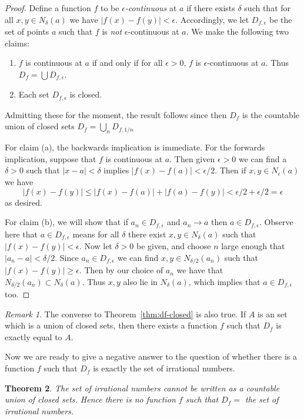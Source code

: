 \documentclass[11pt,oneside]{amsbook}
\theoremstyle{definition}
\theoremstyle{plain}
\newtheorem{theorem}{Theorem}[section]
\theoremstyle{definition}
\theoremstyle{remark}
\newtheorem{remark}[theorem]{Remark}
\numberwithin{equation}{section}
\numberwithin{figure}{section}
\begin{document}
\begin{proof}
  Define a function $f$ to be \emph{$\epsilon$-continuous} at $a$ if there exists $\delta$ such that for all $x,y\in N_\delta(a)$ we have $|f(x)-f(y)|<\epsilon$. Accordingly, we let $D_{f,\epsilon}$ be the set of points $a$ such that $f$ is \emph{not} $\epsilon$-continuous at $a$. We make the following two claims:
  \begin{enumerate}
  \item $f$ is continuous at $a$ if and only if for all $\epsilon>0$, $f$ is $\epsilon$-continuous at $a$. Thus $D_f=\bigcup D_{f,\epsilon}$.
  \item Each set $D_{f,\epsilon}$ is closed.
  \end{enumerate}
  Admitting these for the moment, the result follows since then $D_f$ is the countable union of closed sets $D_f=\bigcup_nD_{f,1/n}$

  For claim (a), the backwards implication is immediate. For the forwards implication, suppose that $f$ is continuous at $a$. Then given $\epsilon>0$ we can find a $\delta>0$ such that $|x-a|<\delta$ implies $|f(x)-f(a)|<\epsilon/2$. Then if $x,y\in N_\epsilon(a)$ we have
  \[|f(x)-f(y)|\leq|f(x)-f(a)|+|f(a)-f(y)|<\epsilon/2+\epsilon/2=\epsilon
  \]
  as desired.

  For claim (b), we will show that if $a_n\in D_{f,\epsilon}$ and $a_n\to a$ then $a\in D_{f,\epsilon}$. Observe here that $a\in D_{f,\epsilon}$ means for all $\delta$ there exist $x,y\in N_\delta(a)$ such that $|f(x)-f(y)|<\epsilon$. Now let $\delta>0$ be given, and choose $n$ large enough that $|a_n-a|<\delta/2$. Since $a_n\in D_{f,\epsilon}$ we can find $x,y\in N_{\delta/2}(a_n)$ such that $|f(x)-f(y)|\geq\epsilon$. Then by our choice of $a_n$ we have that $N_{\delta/2}(a_n)\subset N_\delta(a)$. Thus $x,y$ also lie in $N_\delta(a)$, which implies that $a\in D_{f,\epsilon}$ too.
\end{proof}

\begin{remark}
  The converse to Theorem~\ref{thm:df-closed} is also true. If $A$ is an set which is a union of closed sets, then there exists a function $f$ such that $D_f$ is exactly equal to $A$.
\end{remark}

Now we are ready to give a negative answer to the question of whether there is a function $f$ such that $D_f$ is exactly the set of irrational numbers.

\begin{theorem}
  \label{thm:df-irrationals}
  The set of irrational numbers cannot be written as a countable union of closed sets. Hence there is no function $f$ such that $D_f=$ the set of irrational numbers.
\end{theorem}
\end{document}
